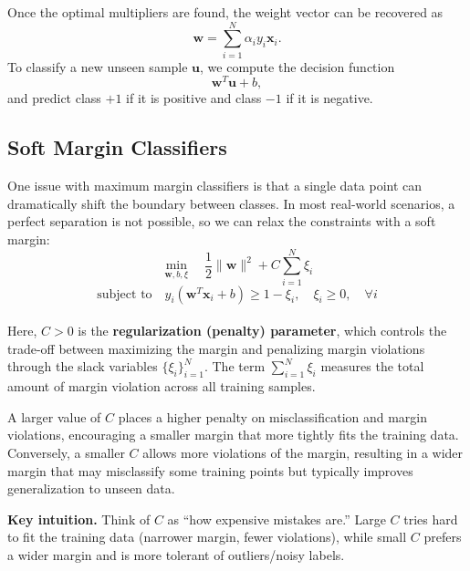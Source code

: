 \documentclass{article}
\newcommand{\keyintuition}[1]{%
\begin{intuitionbox}
\noindent\textbf{Key intuition.} #1
\end{intuitionbox}
}
\begin{document}
Once the optimal multipliers are found, the weight vector can be recovered as
\[
\mathbf{w} = \sum_{i=1}^{N} \alpha_i y_i \mathbf{x}_i.
\]
To classify a new unseen sample $\mathbf{u}$, we compute the decision function
\[
\mathbf{w}^T\mathbf{u} + b,
\]
and predict class $+1$ if it is positive and class $-1$ if it is negative.


\subsection{Soft Margin Classifiers}
One issue with maximum margin classifiers is that a single data point can dramatically shift the boundary between classes. In most real-world scenarios, a perfect separation is not possible, so we can relax the constraints with a soft margin:
\[
\min_{\mathbf{w}, b, \xi} \quad \frac{1}{2} \|\mathbf{w}\|^2 + C \sum_{i=1}^{N} \xi_i
\]
\[
\text{subject to} \quad y_i (\mathbf{w}^T \mathbf{x}_i + b) \geq 1 - \xi_i, \quad \xi_i \geq 0, \quad \forall i
\]\\
Here, $C > 0$ is the \textbf{regularization (penalty) parameter}, which controls the trade-off between maximizing the margin and penalizing margin violations through the slack variables $\{\xi_i\}_{i=1}^N$. The term $\sum_{i=1}^N \xi_i$ measures the total amount of margin violation across all training samples.

A larger value of $C$ places a higher penalty on misclassification and margin violations, encouraging a smaller margin that more tightly fits the training data. Conversely, a smaller $C$ allows more violations of the margin, resulting in a wider margin that may misclassify some training points but typically improves generalization to unseen data.

\keyintuition{
Think of $C$ as “how expensive mistakes are.”
Large $C$ tries hard to fit the training data (narrower margin, fewer violations),
while small $C$ prefers a wider margin and is more tolerant of outliers/noisy labels.
}
\end{document}
